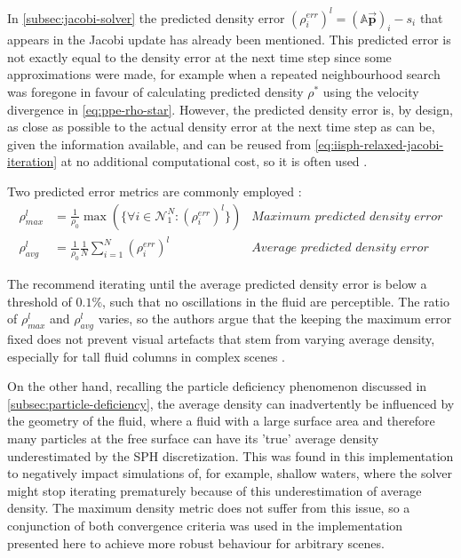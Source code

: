 \documentclass[oneside, a4paper]{book}
\newcommand\vek[1]{\vec{\bm{#1}}}
\newcommand\br[1]{\left(#1\right)}
\begin{document}
  In \autoref{subsec:jacobi-solver} the predicted density error $\br{\rho^{err}_i}^l = \br{\mathds{A}\vek{p}}_i-s_i$ that appears in the Jacobi update has already been mentioned. This predicted error is not exactly equal to the density error at the next time step since some approximations were made, for example when a repeated neighbourhood search was foregone in favour of calculating predicted density $\rho^*$ using the velocity divergence in \autoref{eq:ppe-rho-star}. However, the predicted density error is, by design, as close as possible to the actual density error at the next time step as can be, given the information available, and can be reused from \autoref{eq:iisph-relaxed-jacobi-iteration} at no additional computational cost, so it is often used \autocites{tutorial2019}{iisph}. 

  Two predicted error metrics are commonly employed \autocite{iisph}:
  \begin{align}
    \rho^{l}_{max} &= \frac{1}{\rho_0}\max\br{\{\forall i\in\mathcal{N}_1^N: \br{\rho^{err}_i}^l\}} 
    &\textit{Maximum predicted density error}\\
    \rho^{l}_{avg} &= \frac{1}{\rho_0}\frac{1}{N}\sum_{i=1}^N \br{\rho^{err}_i}^l
    &\textit{Average predicted density error}
  \end{align}

  The \autocite[authors of IISPH]{iisph} recommend iterating until the average predicted density error is below a threshold of $0.1\%$, such that no oscillations in the fluid are perceptible. The ratio of $\rho^{l}_{max}$ and $\rho^{l}_{avg}$ varies, so the authors argue that the keeping the maximum error fixed does not prevent visual artefacts that stem from varying average density, especially for tall fluid columns in complex scenes \autocite{iisph}. 
  
  On the other hand, recalling the particle deficiency phenomenon discussed in \autoref{subsec:particle-deficiency}, the average density can inadvertently be influenced by the geometry of the fluid, where a fluid with a large surface area and therefore many particles at the free surface can have its 'true' average density underestimated by the SPH discretization. This was found in this implementation to negatively impact simulations of, for example, shallow waters, where the solver might stop iterating prematurely because of this underestimation of average density. The maximum density metric does not suffer from this issue, so a conjunction of both convergence criteria was used in the implementation presented here to achieve more robust behaviour for arbitrary scenes. 
\end{document}
